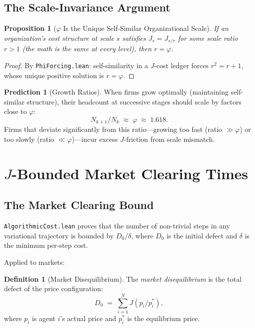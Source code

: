 \documentclass[11pt,a4paper]{article}
\theoremstyle{plain}
\newtheorem{proposition}[theorem]{Proposition}
\theoremstyle{definition}
\newtheorem{definition}[theorem]{Definition}
\newtheorem{prediction}[theorem]{Prediction}
\theoremstyle{remark}
\newcommand{\Jcost}{J}
\begin{document}
\subsection{The Scale-Invariance Argument}

\begin{proposition}[$\varphi$ Is the Unique Self-Similar Organizational Scale]
If an organization's cost structure at scale $s$ satisfies $\Jcost_s = \Jcost_{s/r}$ for some scale ratio $r > 1$ (the math is the same at every level), then $r = \varphi$.
\end{proposition}

\begin{proof}
By \texttt{PhiForcing.lean}: self-similarity in a $\Jcost$-cost ledger forces $r^2 = r + 1$, whose unique positive solution is $r = \varphi$.
\end{proof}

\begin{prediction}[Growth Ratios]\label{pred:growth}
When firms grow optimally (maintaining self-similar structure), their headcount at successive stages should scale by factors close to $\varphi$:
\[
N_{k+1} / N_k \;\approx\; \varphi \;\approx\; 1.618.
\]
Firms that deviate significantly from this ratio---growing too fast (ratio $\gg \varphi$) or too slowly (ratio $\ll \varphi$)---incur excess $\Jcost$-friction from scale mismatch.
\end{prediction}

\section{$\Jcost$-Bounded Market Clearing Times}\label{sec:clearing}

\subsection{The Market Clearing Bound}

\texttt{AlgorithmicCost.lean} proves that the number of non-trivial steps in any variational trajectory is bounded by $D_0/\delta$, where $D_0$ is the initial defect and $\delta$ is the minimum per-step cost.

Applied to markets:

\begin{definition}[Market Disequilibrium]\label{def:diseq}
The \emph{market disequilibrium} is the total defect of the price configuration:
\[
D_0 \;=\; \sum_{i=1}^N \Jcost(p_i/p_i^*),
\]
where $p_i$ is agent $i$'s actual price and $p_i^*$ is the equilibrium price.
\end{definition}
\end{document}
